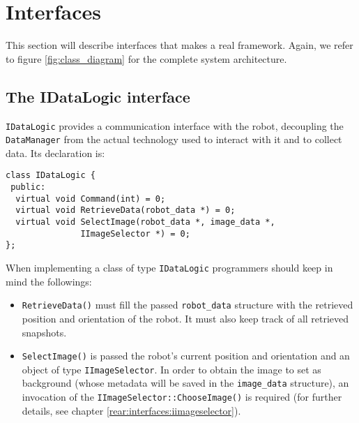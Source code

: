 \section{Interfaces}
\label{rear:interfaces}

This section will describe interfaces that
makes \framework{} a real framework. Again, we refer
to figure
\ref{fig:class_diagram} for the complete system
architecture.

\subsection{The IDataLogic interface}
\label{rear:interfaces:idatalogic}

\texttt{IDataLogic} provides a communication interface 
with the robot, decoupling the \texttt{DataManager} 
from the actual technology used to interact with it 
and to collect data. Its declaration is:
\\ 
\begin{lstlisting}[caption={\texttt{IDataLogic} declaration}, label={code:idatalogic}]
class IDataLogic {
 public:
  virtual void Command(int) = 0;
  virtual void RetrieveData(robot_data *) = 0;
  virtual void SelectImage(robot_data *, image_data *,
			   IImageSelector *) = 0;
};
\end{lstlisting}

When implementing a class of type \texttt{IDataLogic}
programmers should keep in mind the followings:

\begin{itemize}
  \item \texttt{RetrieveData()} must fill the passed 
    \texttt{robot\_data} structure with the retrieved position and
    orientation of the robot. It must also keep track of 
    all retrieved snapshots.
  \item \texttt{SelectImage()} is passed the robot's current 
    position and orientation and an object of type 
    \texttt{IImageSelector}. In order to obtain the image 
    to set as background (whose metadata will be saved 
    in the \texttt{image\_data} structure), an 
    invocation of the \texttt{IImageSelector::ChooseImage()}
    is required (for further details, see chapter
    \ref{rear:interfaces:iimageselector}).
\end{itemize}

